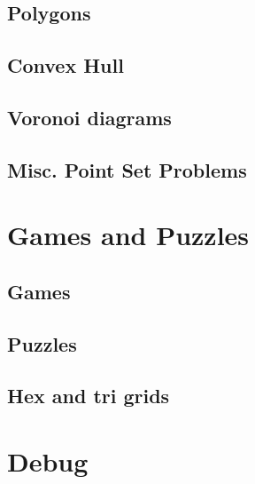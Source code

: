 \documentclass[10pt, a4paper, notitlepage]{report}
\begin{document}
\begin{multicols*}{3}
	\section{Polygons}
	\section{Convex Hull}
	\section{Voronoi diagrams}
	\section{Misc. Point Set Problems}
	
	\chapter{Games and Puzzles}
	\section{Games}
	\section{Puzzles}
	\section{Hex and tri grids}
	
	\chapter{Debug}
	
	\end{multicols*}
\end{document}

